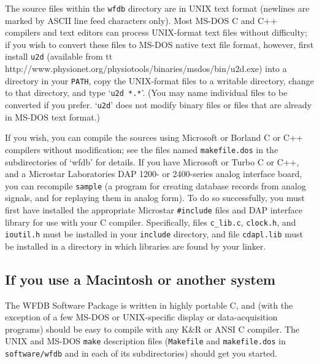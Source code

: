 
The source files within the {\tt wfdb} directory are in UNIX text format
(newlines are marked by ASCII line feed characters only).  Most MS-DOS C and
C++ compilers and text editors can process UNIX-format text files without
difficulty; if you wish to convert these files to MS-DOS native text file
format, however, first install {\tt u2d} (available from
{tt http://www\-.physio\-net.org/\-physio\-tools/\-bi\-naries/\-msdos/\-bin/u2d.exe}) into a directory in your
{\tt PATH}, copy the UNIX-format files to a writable directory, change to that
directory, and type `{\tt u2d *.*}'.   (You may name individual files to be
converted if you prefer. `{\tt u2d}' does not modify binary files or files
that are already in MS-DOS text format.) 
 
If you wish, you can compile the sources using Microsoft or Borland C or C++
compilers without modification; see the files named {\tt makefile.dos} in the
subdirectories of `wfdb' for details.  If you have Microsoft or Turbo C or C++,
and a Microstar Laboratories DAP 1200- or 2400-series analog interface board,
you can recompile {\tt sample} (a program for creating database records from
analog signals, and for replaying them in analog form).  To do so successfully,
you must first have installed the appropriate Microstar {\tt \#include} files
and DAP interface library for use with your C compiler.  Specifically, files
{\tt c\_lib.c}, {\tt clock.h}, and {\tt ioutil.h} must be installed in your
{\tt include} directory, and file {\tt cdapl.lib} must be installed in a
directory in which libraries are found by your linker.

\subsection*{If you use a Macintosh or another system}

The WFDB Software Package is written in highly portable C, and (with
the exception of a few MS-DOS or UNIX-specific display or
data-acquisition programs) should be easy to compile with any K\&R or
ANSI C compiler.  The UNIX and MS-DOS {\tt make} description files
({\tt Makefile} and {\tt makefile.dos} in {\tt software/wfdb} and in
each of its subdirectories) should get you started.


